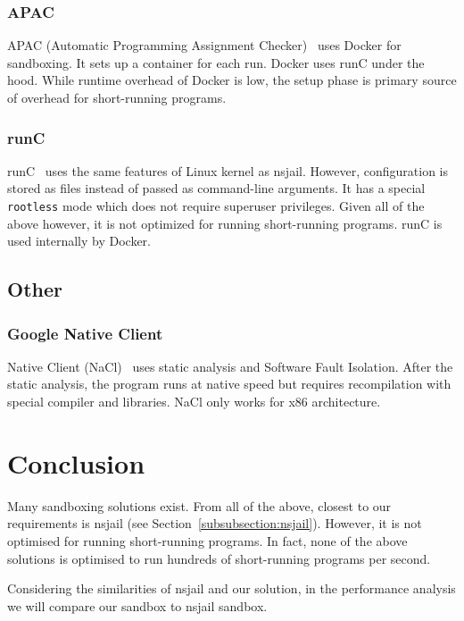 \documentclass[en]{pracamgr}
\begin{document}
\subsubsection{APAC}
APAC (Automatic Programming Assignment Checker)~\cite{SPACEK20151665} uses Docker for sandboxing. It sets up a container for each run. Docker uses runC under the hood. While runtime overhead of Docker is low, the setup phase is primary source of overhead for short-running programs.

\subsubsection{runC}
runC~\cite{cochak2021runc} uses the same features of Linux kernel as nsjail. However, configuration is stored as files instead of passed as command-line arguments. It has a special \texttt{rootless} mode which does not require superuser privileges. Given all of the above however, it is not optimized for running short-running programs. runC is used internally by Docker.

\subsection{Other}

\subsubsection{Google Native Client}
Native Client (NaCl)~\cite{yee2010native} uses static analysis and Software Fault Isolation. After the static analysis, the program runs at native speed but requires recompilation with special compiler and libraries. NaCl only works for x86 architecture.

\section{Conclusion}

Many sandboxing solutions exist. From all of the above, closest to our requirements is nsjail (see Section~\ref{subsubsection:nsjail}). However, it is not optimised for running short-running programs. In fact, none of the above solutions is optimised to run hundreds of short-running programs per second.

Considering the similarities of nsjail and our solution, in the performance analysis we will compare our sandbox to nsjail sandbox.

\end{document}
